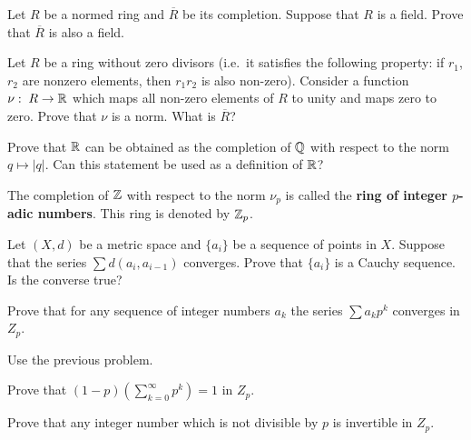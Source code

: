 \documentclass[12pt]{article}
\begin{document}
\begin{zadacha}[*] Let $R$ be a normed ring and $\overline{R}$ be its
  completion. Suppose that $R$ is a field. Prove that $\overline{R}$
  is also a field.
\end{zadacha}

\begin{zadacha}[*] Let $R$ be a ring without zero divisors  (i.e.\
  it satisfies the following property: if
  $r_1$, $r_2$ are nonzero elements, then $r_1r_2$ is also non-zero).
Consider a function $\nu:\; R \to {\mathbb R}$ which maps all non-zero elements
of $R$ to unity and maps zero to zero. Prove that $\nu$ is a
norm. What is $\overline{R}$? 
\end{zadacha}

\begin{zadacha} Prove that ${\mathbb R}$ can be obtained as the completion of
${\mathbb Q}$ with respect to the norm $q \mapsto |q|$. 
Can this statement be used
as a definition of ${\mathbb R}$?
\end{zadacha}

\begin{opredelenie} The completion of ${\mathbb Z}$ with respect to the norm
$\nu_p$ is called the {\bf ring of integer $p$-adic numbers}. This ring
is denoted by ${\mathbb Z}_p$.
\end{opredelenie}

\begin{zadacha} Let $(X, d)$ be a metric space and $\{a_i\}$ be a
  sequence of points in $X$.  Suppose that the series $\sum d(a_i,
  a_{i-1})$ converges. Prove that $\{a_i\}$ is a Cauchy sequence. Is
  the converse true?
\end{zadacha}

\begin{zadacha}[!] Prove that for any sequence of integer numbers
  $a_k$ the series $\sum a_k p^k$ converges in $Z_p$.
\end{zadacha}

\begin{ukazanie} Use the previous problem.
\end{ukazanie}

\begin{zadacha} Prove that $(1-p) (\sum_{k=0}^\infty  p^k) =1$
in $Z_p$.
\end{zadacha}

\begin{zadacha}[*] Prove that any integer number which is not
  divisible by $p$ is invertible in $Z_p$.
\end{zadacha}
\end{document}
